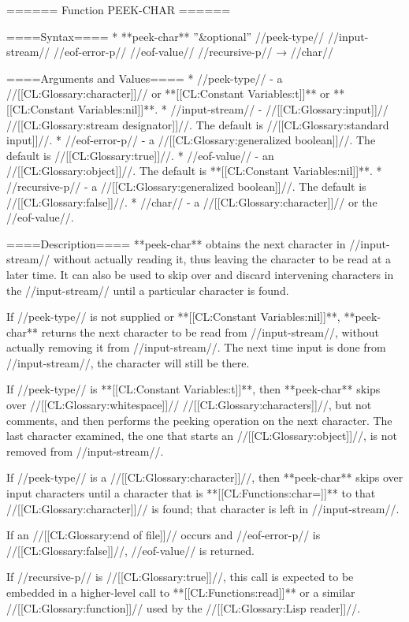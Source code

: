 ====== Function PEEK-CHAR ======

====Syntax====
  * **peek-char** ''&optional'' //peek-type// //input-stream// //eof-error-p// //eof-value// //recursive-p// → //char//

====Arguments and Values====
  * //peek-type// - a //[[CL:Glossary:character]]// or **[[CL:Constant Variables:t]]** or **[[CL:Constant Variables:nil]]**.
  * //input-stream// - //[[CL:Glossary:input]]// //[[CL:Glossary:stream designator]]//. The default is //[[CL:Glossary:standard input]]//.
  * //eof-error-p// - a //[[CL:Glossary:generalized boolean]]//. The default is //[[CL:Glossary:true]]//.
  * //eof-value// - an //[[CL:Glossary:object]]//. The default is **[[CL:Constant Variables:nil]]**.
  * //recursive-p// - a //[[CL:Glossary:generalized boolean]]//. The default is //[[CL:Glossary:false]]//.
  * //char// - a //[[CL:Glossary:character]]// or the //eof-value//.

====Description====
**peek-char** obtains the next character in //input-stream// without actually reading it, thus leaving the character to be read at a later time. It can also be used to skip over and discard intervening characters in the //input-stream// until a particular character is found.

If //peek-type// is not supplied or **[[CL:Constant Variables:nil]]**, **peek-char** returns the next character to be read from //input-stream//, without actually removing it from //input-stream//. The next time input is done from //input-stream//, the character will still be there.

If //peek-type// is **[[CL:Constant Variables:t]]**, then **peek-char** skips over //[[CL:Glossary:whitespace]]// //[[CL:Glossary:characters]]//, but not comments, and then performs the peeking operation on the next character. The last character examined, the one that starts an //[[CL:Glossary:object]]//, is not removed from //input-stream//.

If //peek-type// is a //[[CL:Glossary:character]]//, then **peek-char** skips over input characters until a character that is **[[CL:Functions:char=]]** to that //[[CL:Glossary:character]]// is found; that character is left in //input-stream//.

If an //[[CL:Glossary:end of file]]// occurs and //eof-error-p// is //[[CL:Glossary:false]]//, //eof-value// is returned.

If //recursive-p// is //[[CL:Glossary:true]]//, this call is expected to be embedded in a higher-level call to **[[CL:Functions:read]]** or a similar //[[CL:Glossary:function]]// used by the //[[CL:Glossary:Lisp reader]]//.

